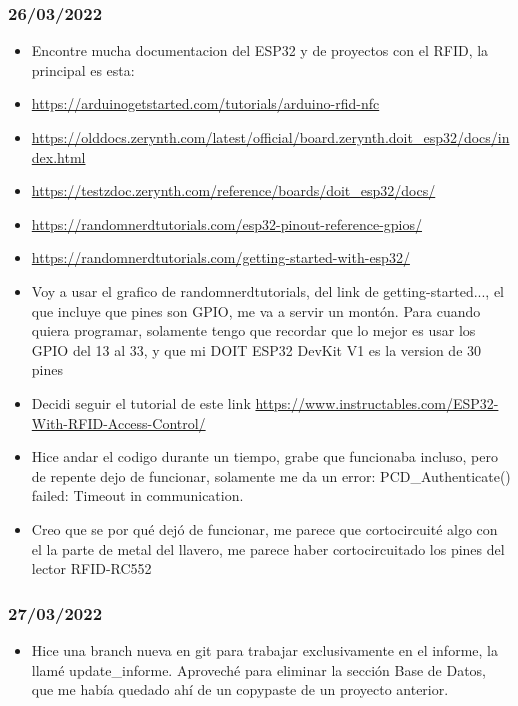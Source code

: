 \documentclass[../informe_krapp.tex]{subfiles}
\begin{document}
\subsubsection{26/03/2022}
\begin{itemize}
	\item Encontre mucha documentacion del ESP32 y de proyectos con el RFID, la principal es esta:
	\item \url{https://arduinogetstarted.com/tutorials/arduino-rfid-nfc}
	\item \url{https://olddocs.zerynth.com/latest/official/board.zerynth.doit_esp32/docs/index.html}
	\item \url{https://testzdoc.zerynth.com/reference/boards/doit_esp32/docs/}
	\item \url{https://randomnerdtutorials.com/esp32-pinout-reference-gpios/}
	\item \url{https://randomnerdtutorials.com/getting-started-with-esp32/}
	\item Voy a usar el grafico de randomnerdtutorials, del link de getting-started...,
	      el que incluye que pines son GPIO, me va a servir un montón.
	      Para cuando quiera programar, solamente tengo que recordar que lo mejor es usar los
	      GPIO del 13 al 33, y que mi DOIT ESP32 DevKit V1 es la version de 30 pines
	\item Decidi seguir el tutorial de este link
	      \url{https://www.instructables.com/ESP32-With-RFID-Access-Control/}
	\item Hice andar el codigo durante un tiempo, grabe que funcionaba incluso, pero de
	      repente dejo de funcionar, solamente me da un error:
	      PCD\_Authenticate() failed: Timeout in communication.
	\item Creo que se por qué dejó de funcionar, me parece que cortocircuité algo
	      con el la parte de metal del llavero, me parece haber cortocircuitado
	      los pines del lector RFID-RC552
\end{itemize}

\subsubsection{27/03/2022}
\begin{itemize}
	\item Hice una branch nueva en git para trabajar exclusivamente en el informe,
	      la llamé update\_informe.
	      Aproveché para eliminar la sección Base de Datos, que me había quedado ahí
	      de un copypaste de un proyecto anterior.
\end{itemize}
\end{document}
